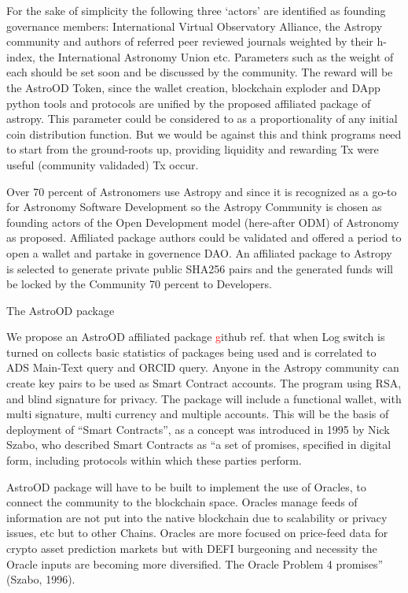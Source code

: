 \documentclass[final,5p,times,twocolumn,authoryear]{elsarticle}
\begin{document}
For the sake of simplicity the following three `actors' are identified as founding governance members: International Virtual Observatory Alliance, the  Astropy community and authors of referred peer reviewed journals weighted by their h-index, the International Astronomy Union etc. Parameters such as the weight of each should be set soon and be discussed by the community. The reward will be the AstroOD Token, since the wallet creation, blockchain exploder and DApp python tools and protocols are unified by the proposed affiliated package of astropy. This parameter could be considered to as a proportionality of any initial coin distribution function. But we would be against this and think programs need to start from the ground-roots up, providing liquidity and rewarding Tx were useful (community validaded) Tx occur. 

Over 70 percent of Astronomers use  Astropy and since it is recognized as a go-to for Astronomy Software Development so the Astropy Community is chosen as founding actors of the Open Development model (here-after ODM) of Astronomy as proposed. Affiliated package authors could be validated and offered a period to open a wallet and partake in governence DAO. An affiliated package to Astropy is selected to generate private public SHA256 pairs and the generated funds will be locked by the Community 70 percent to Developers. 

The AstroOD package 

We propose an AstroOD affiliated package \textcolor{red} github ref. that when Log switch is turned on collects basic statistics of packages being used and is correlated to ADS Main-Text query and ORCID query. Anyone in the Astropy community can create key pairs to be used as Smart Contract accounts. The program using RSA, and blind signature for privacy. The package will include a functional wallet, with multi signature, multi currency and multiple accounts. This will be the basis of deployment of “Smart Contracts”, as a concept was introduced in 1995 by Nick Szabo, who described Smart Contracts as “a set of promises,
specified in digital form, including protocols within which these parties perform.

AstroOD package will have to be built to implement the use of Oracles, to connect the community to the blockchain space. Oracles manage feeds of information are not put into the native blockchain due to scalability or privacy issues, etc but to other Chains.  Oracles are more focused on price-feed data for crypto asset prediction markets but with DEFI burgeoning and necessity the Oracle inputs are becoming more diversified.  The Oracle Problem 4 promises” (Szabo, 1996). 
\end{document}
